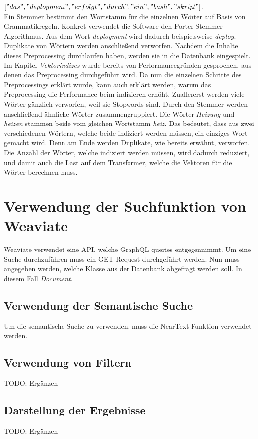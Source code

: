 \(["das", "deployment", "erfolgt", "durch", "ein", "bash", "skript"]\).\\

Ein Stemmer bestimmt den Wortstamm für die einzelnen Wörter auf Basis von Grammatikregeln.
Konkret verwendet die Software den Porter-Stemmer-Algorithmus.
Aus dem Wort \textit{deployment} wird dadurch beispielsweise \textit{deploy}.
Duplikate von Wörtern werden anschließend verworfen.
Nachdem die Inhalte dieses Preprocessing durchlaufen haben, werden sie in die Datenbank eingespielt.\\

Im Kapitel \textit{Vektorindizes} wurde bereits von Performancegründen gesprochen, aus denen das Preprocessing durchgeführt wird.
Da nun die einzelnen Schritte des Preprocessings erklärt wurde, kann auch erklärt werden, warum das Preprocessing die Performance beim indizieren erhöht.
Zuallererst werden viele Wörter gänzlich verworfen, weil sie Stopwords sind.
Durch den Stemmer werden anschließend ähnliche Wörter zusammengruppiert.
Die Wörter \textit{Heizung} und \textit{heizen} stammen beide vom gleichen Wortstamm \textit{heiz}.
Das bedeutet, dass aus zwei verschiedenen Wörtern, welche beide indiziert werden müssen, ein einziges Wort gemacht wird.
Denn am Ende werden Duplikate, wie bereits erwähnt, verworfen.
Die Anzahl der Wörter, welche indiziert werden müssen, wird dadurch reduziert, und damit auch die Last auf dem Transformer, welche die Vektoren für die Wörter berechnen muss.

\section{Verwendung der Suchfunktion von Weaviate}
Weaviate verwendet eine API, welche GraphQL queries entgegennimmt.
Um eine Suche durchzuführen muss ein GET-Request durchgeführt werden.
Nun muss angegeben werden, welche Klasse aus der Datenbank abgefragt werden soll.
In diesem Fall \textit{Document}.

\subsection{Verwendung der Semantische Suche}
Um die semantische Suche zu verwenden, muss die NearText Funktion verwendet werden.

\subsection{Verwendung von Filtern}
TODO: Ergänzen

\subsection{Darstellung der Ergebnisse}
TODO: Ergänzen